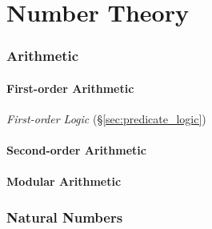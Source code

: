 \part{Number Theory}\label{sec:number_theory}



\section{Arithmetic}\label{sec:arithmetic}

\subsection{First-order Arithmetic}\label{sec:firstorder_arithmetic}

\emph{First-order Logic} (\S\ref{sec:predicate_logic})

\subsection{Second-order Arithmetic}\label{sec:second_order_arithmetic}

\subsection{Modular Arithmetic}\label{sec:modular_arithmetic}



\section{Natural Numbers}\label{sec:natural_number}

